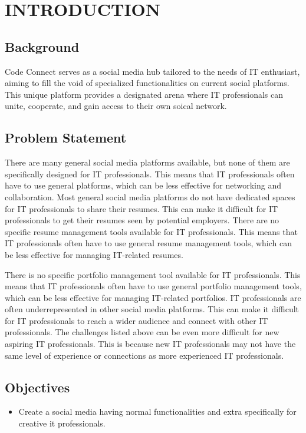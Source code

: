 \chapter{INTRODUCTION}



\section{Background}

Code Connect serves as a social media hub tailored to the needs of IT enthusiast, aiming to fill the void of specialized functionalities on current social platforms. This unique platform provides a designated arena where IT professionals can unite, cooperate, and gain access to their own soical network.
\section{Problem Statement}

There are many general social media platforms available, but none of them are specifically designed for IT professionals. This means that IT professionals often have to use general platforms, which can be less effective for networking and collaboration.
Most general social media platforms do not have dedicated spaces for IT professionals to share their resumes. This can make it difficult for IT professionals to get their resumes seen by potential employers.
There are no specific resume management tools available for IT professionals. This means that IT professionals often have to use general resume management tools, which can be less effective for managing IT-related resumes.

There is no specific portfolio management tool available for IT professionals. This means that IT professionals often have to use general portfolio management tools, which can be less effective for managing IT-related portfolios.
IT professionals are often underrepresented in other social media platforms. This can make it difficult for IT professionals to reach a wider audience and connect with other IT professionals.
The challenges listed above can be even more difficult for new aspiring IT professionals. This is because new IT professionals may not have the same level of experience or connections as more experienced IT professionals.
\section{Objectives}
\begin{itemize}
    \item Create a social media having normal functionalities and extra specifically  for creative it professionals.
\end{itemize}
